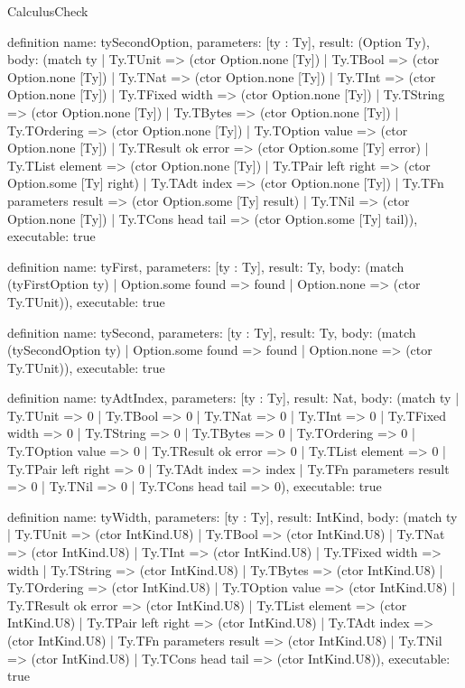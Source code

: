 \begin{lexlean}{CalculusCheck}
\begin{semanticmodule}
definition{
  name: tySecondOption,
  parameters: [ty : Ty],
  result: (Option Ty),
  body: (match ty
    | Ty.TUnit => (ctor Option.none [Ty])
    | Ty.TBool => (ctor Option.none [Ty])
    | Ty.TNat => (ctor Option.none [Ty])
    | Ty.TInt => (ctor Option.none [Ty])
    | Ty.TFixed width => (ctor Option.none [Ty])
    | Ty.TString => (ctor Option.none [Ty])
    | Ty.TBytes => (ctor Option.none [Ty])
    | Ty.TOrdering => (ctor Option.none [Ty])
    | Ty.TOption value => (ctor Option.none [Ty])
    | Ty.TResult ok error => (ctor Option.some [Ty] error)
    | Ty.TList element => (ctor Option.none [Ty])
    | Ty.TPair left right => (ctor Option.some [Ty] right)
    | Ty.TAdt index => (ctor Option.none [Ty])
    | Ty.TFn parameters result => (ctor Option.some [Ty] result)
    | Ty.TNil => (ctor Option.none [Ty])
    | Ty.TCons head tail => (ctor Option.some [Ty] tail)),
  executable: true
}

definition{
  name: tyFirst,
  parameters: [ty : Ty],
  result: Ty,
  body: (match (tyFirstOption ty) | Option.some found => found | Option.none => (ctor Ty.TUnit)),
  executable: true
}

definition{
  name: tySecond,
  parameters: [ty : Ty],
  result: Ty,
  body: (match (tySecondOption ty) | Option.some found => found | Option.none => (ctor Ty.TUnit)),
  executable: true
}

definition{
  name: tyAdtIndex,
  parameters: [ty : Ty],
  result: Nat,
  body: (match ty
    | Ty.TUnit => 0
    | Ty.TBool => 0
    | Ty.TNat => 0
    | Ty.TInt => 0
    | Ty.TFixed width => 0
    | Ty.TString => 0
    | Ty.TBytes => 0
    | Ty.TOrdering => 0
    | Ty.TOption value => 0
    | Ty.TResult ok error => 0
    | Ty.TList element => 0
    | Ty.TPair left right => 0
    | Ty.TAdt index => index
    | Ty.TFn parameters result => 0
    | Ty.TNil => 0
    | Ty.TCons head tail => 0),
  executable: true
}

definition{
  name: tyWidth,
  parameters: [ty : Ty],
  result: IntKind,
  body: (match ty
    | Ty.TUnit => (ctor IntKind.U8)
    | Ty.TBool => (ctor IntKind.U8)
    | Ty.TNat => (ctor IntKind.U8)
    | Ty.TInt => (ctor IntKind.U8)
    | Ty.TFixed width => width
    | Ty.TString => (ctor IntKind.U8)
    | Ty.TBytes => (ctor IntKind.U8)
    | Ty.TOrdering => (ctor IntKind.U8)
    | Ty.TOption value => (ctor IntKind.U8)
    | Ty.TResult ok error => (ctor IntKind.U8)
    | Ty.TList element => (ctor IntKind.U8)
    | Ty.TPair left right => (ctor IntKind.U8)
    | Ty.TAdt index => (ctor IntKind.U8)
    | Ty.TFn parameters result => (ctor IntKind.U8)
    | Ty.TNil => (ctor IntKind.U8)
    | Ty.TCons head tail => (ctor IntKind.U8)),
  executable: true
}


\end{semanticmodule}
\end{lexlean}
